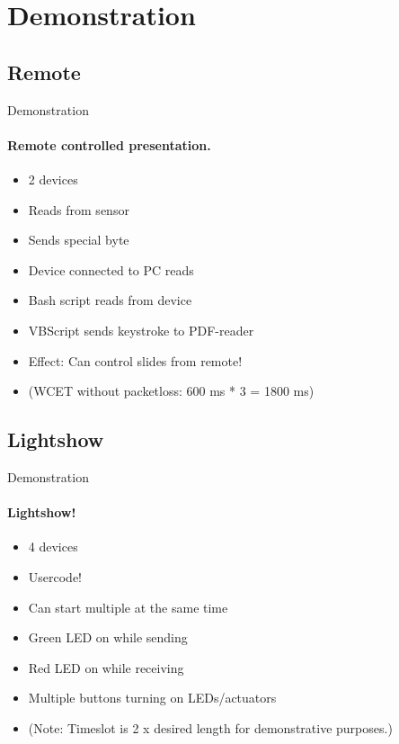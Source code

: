 \section{Demonstration}
    \subsection{Remote}
    \begin{frame}[t]{Demonstration}\framesubtitle{Remote controlled presentation.}
        \begin{itemize}
            \item 2 devices
            \item Reads from sensor
            \item Sends special byte
            \item Device connected to PC reads
            \item Bash script reads from device
            \item VBScript sends keystroke to PDF-reader
            \item Effect: Can control slides from remote!
            \item (WCET without packetloss: 600 ms * 3 = 1800 ms)
        \end{itemize}
    \end{frame}
    \subsection{Lightshow}
    \begin{frame}[t]{Demonstration}\framesubtitle{Lightshow!}
        \begin{itemize}
            \item 4 devices
            \item Usercode!
            \item Can start multiple at the same time
            \item Green LED on while sending
            \item Red LED on while receiving
            \item Multiple buttons turning on LEDs/actuators
            \item (Note: Timeslot is 2 x desired length for demonstrative purposes.)
        \end{itemize}
    \end{frame}
